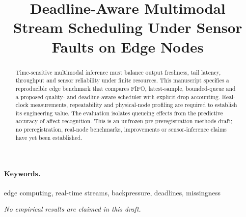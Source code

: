 \documentclass[11pt,a4paper]{article}
\title{Deadline-Aware Multimodal Stream Scheduling Under Sensor Faults on Edge Nodes}
\author{}
\begin{document}
\maketitle
\begin{abstract}
Time-sensitive multimodal inference must balance output freshness, tail latency, throughput and sensor reliability under finite resources. This manuscript specifies a reproducible edge benchmark that compares FIFO, latest-sample, bounded-queue and a proposed quality- and deadline-aware scheduler with explicit drop accounting. Real-clock measurements, repeatability and physical-node profiling are required to establish its engineering value. The evaluation isolates queueing effects from the predictive accuracy of affect recognition. This is an unfrozen pre-preregistration methods draft; no preregistration, real-node benchmarks, improvements or sensor-inference claims have yet been established.
\end{abstract}
\paragraph{Keywords.}
edge computing, real-time streams, backpressure, deadlines, missingness

\noindent\textit{No empirical results are claimed in this draft.}






\end{document}
